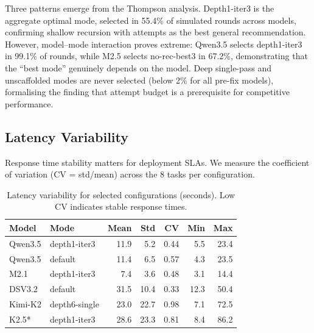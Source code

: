 \documentclass[11pt]{article}
\begin{document}
Three patterns emerge from the Thompson analysis. Depth1-iter3 is the aggregate optimal mode, selected in 55.4\% of simulated rounds across models, confirming shallow recursion with attempts as the best general recommendation. However, model--mode interaction proves extreme: Qwen3.5 selects depth1-iter3 in 99.1\% of rounds, while M2.5 selects no-rec-best3 in 67.2\%, demonstrating that the ``best mode'' genuinely depends on the model. Deep single-pass and unscaffolded modes are never selected (below 2\% for all pre-fix models), formalising the finding that attempt budget is a prerequisite for competitive performance.

\subsection{Latency Variability}

Response time stability matters for deployment SLAs. We measure the coefficient of variation (CV = std/mean) across the 8 tasks per configuration.

\begin{table}[t]
\centering
\caption{Latency variability for selected configurations (seconds). Low CV indicates stable response times.}
\label{tab:latency-cv}
\begin{tabular}{llrrrrr}
\toprule
Model & Mode & Mean & Std & CV & Min & Max \\
\midrule
Qwen3.5 & depth1-iter3 & 11.9 & 5.2 & 0.44 & 5.5 & 23.4 \\
Qwen3.5 & default & 11.4 & 6.5 & 0.57 & 4.3 & 23.5 \\
M2.1 & depth1-iter3 & 7.4 & 3.6 & 0.48 & 3.1 & 14.4 \\
DSV3.2 & default & 31.5 & 10.4 & 0.33 & 12.3 & 50.4 \\
Kimi-K2 & depth6-single & 23.0 & 22.7 & 0.98 & 7.1 & 72.5 \\
K2.5* & depth1-iter3 & 28.6 & 23.3 & 0.81 & 8.4 & 86.2 \\
\bottomrule
\end{tabular}
\end{table}
\end{document}
